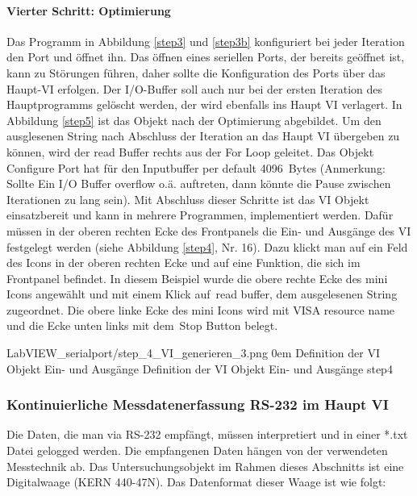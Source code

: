 {\paragraph{Vierter Schritt: Optimierung} Das Programm in Abbildung \ref{step3} und \ref{step3b} konfiguriert bei jeder Iteration den Port und öffnet ihn. Das öffnen eines seriellen Ports, der bereits geöffnet ist, kann zu Störungen führen, daher sollte die Konfiguration des Ports über das Haupt-VI erfolgen. Der I/O-Buffer soll auch nur bei der ersten Iteration des Hauptprogramms gelöscht werden, der wird ebenfalls ins Haupt VI verlagert. In Abbildung \ref{step5} ist das Objekt nach der Optimierung abgebildet. Um den ausglesenen String nach Abschluss der Iteration an das Haupt VI übergeben zu können, wird der read Buffer rechts aus der For Loop geleitet. Das Objekt \,{\Menlo Configure Port} hat für den Inputbuffer per default 4096 \,{\Menlo Bytes} (Anmerkung: Sollte Ein I/O Buffer overflow o.ä. auftreten, dann könnte die Pause zwischen Iterationen zu lang sein). Mit Abschluss dieser Schritte ist das VI Objekt einsatzbereit und kann in mehrere Programmen, implementiert werden. Dafür müssen in der oberen rechten Ecke des Frontpanels die Ein- und Ausgänge des VI festgelegt werden (siehe Abbildung \ref{step4}, Nr. 16). Dazu klickt man auf ein Feld des Icons in der oberen rechten Ecke und auf eine Funktion, die sich im Frontpanel befindet. In diesem Beispiel wurde die obere rechte Ecke des mini Icons angewählt und mit einem Klick auf \,{\Menlo read buffer}, dem ausgelesenen String zugeordnet. Die obere linke Ecke des mini Icons wird mit VISA resource name und die Ecke unten links mit dem \,{\Menlo Stop Button} belegt.

{LabVIEW_serialport/step_4_VI_generieren_3.png}
{0em}
{Definition der VI Objekt Ein- und Ausgänge}
{Definition der VI Objekt Ein- und Ausgänge}
{step4}


\subsubsection{Kontinuierliche Messdatenerfassung RS-232 im Haupt VI}

Die Daten, die man via RS-232 empfängt, müssen interpretiert und in einer *.txt Datei gelogged werden. Die empfangenen Daten hängen von der verwendeten Messtechnik ab. Das Untersuchungsobjekt im Rahmen dieses Abschnitts ist eine Digitalwaage (KERN 440-47N). Das Datenformat dieser Waage ist wie folgt:

}
